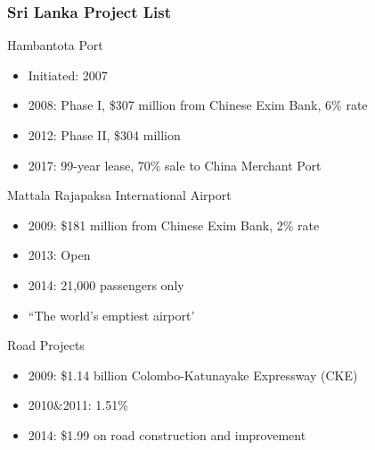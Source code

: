 \documentclass[mathserif]{beamer}
\begin{document}
    \begin{frame}
        \frametitle{Sri Lanka Project List}
        Hambantota Port
        \begin{itemize}
            \item Initiated: 2007
            \item 2008: Phase I, \$307 million from Chinese Exim Bank, 6\% rate
            \item 2012: Phase II, \$304 million
            \item 2017: 99-year lease, 70\% sale to China Merchant Port
        \end{itemize}
        \vfill
        Mattala Rajapaksa International Airport
        \begin{itemize}
            \item 2009: \$181 million from Chinese Exim Bank, 2\% rate
            \item 2013: Open
            \item 2014: 21,000 passengers only
            \item ``The world's emptiest airport'
        \end{itemize}
        \vfill
        Road Projects
        \begin{itemize}
            \item 2009: \$1.14 billion Colombo-Katunayake Expressway (CKE)
            \item 2010\&2011: 1.51\%
            \item 2014: \$1.99 on road construction and improvement
        \end{itemize}
    \end{frame}
\end{document}
